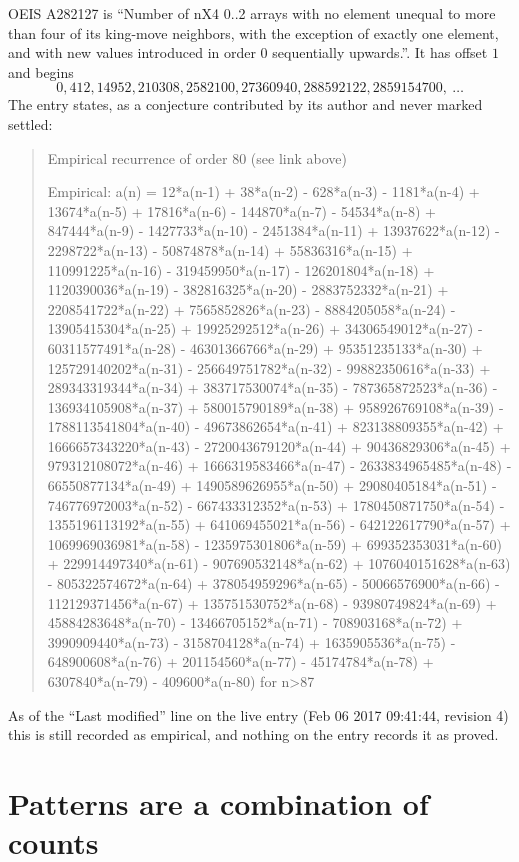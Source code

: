 \documentclass[11pt,a4paper]{article}
\theoremstyle{plain}
\theoremstyle{definition}
\begin{document}
OEIS A282127 is ``Number of nX4 0..2 arrays with no element unequal to more than four of its king-move neighbors, with the exception of exactly one element, and with new values introduced in order 0 sequentially upwards.''. It has offset $1$ and begins
\[
0, 412, 14952, 210308, 2582100, 27360940, 288592122, 2859154700,\ \dots
\]
The entry states, as a conjecture contributed by its author and never marked settled:
\begin{quote}
Empirical recurrence of order 80 (see link above)

Empirical: a(n) = 12*a(n-1) + 38*a(n-2) - 628*a(n-3) - 1181*a(n-4) + 13674*a(n-5) + 17816*a(n-6) - 144870*a(n-7) - 54534*a(n-8) + 847444*a(n-9) - 1427733*a(n-10) - 2451384*a(n-11) + 13937622*a(n-12) - 2298722*a(n-13) - 50874878*a(n-14) + 55836316*a(n-15) + 110991225*a(n-16) - 319459950*a(n-17) - 126201804*a(n-18) + 1120390036*a(n-19) - 382816325*a(n-20) - 2883752332*a(n-21) + 2208541722*a(n-22) + 7565852826*a(n-23) - 8884205058*a(n-24) - 13905415304*a(n-25) + 19925292512*a(n-26) + 34306549012*a(n-27) - 60311577491*a(n-28) - 46301366766*a(n-29) + 95351235133*a(n-30) + 125729140202*a(n-31) - 256649751782*a(n-32) - 99882350616*a(n-33) + 289343319344*a(n-34) + 383717530074*a(n-35) - 787365872523*a(n-36) - 136934105908*a(n-37) + 580015790189*a(n-38) + 958926769108*a(n-39) - 1788113541804*a(n-40) - 49673862654*a(n-41) + 823138809355*a(n-42) + 1666657343220*a(n-43) - 2720043679120*a(n-44) + 90436829306*a(n-45) + 979312108072*a(n-46) + 1666319583466*a(n-47) - 2633834965485*a(n-48) - 66550877134*a(n-49) + 1490589626955*a(n-50) + 29080405184*a(n-51) - 746776972003*a(n-52) - 667433312352*a(n-53) + 1780450871750*a(n-54) - 1355196113192*a(n-55) + 641069455021*a(n-56) - 642122617790*a(n-57) + 1069969036981*a(n-58) - 1235975301806*a(n-59) + 699352353031*a(n-60) + 229914497340*a(n-61) - 907690532148*a(n-62) + 1076040151628*a(n-63) - 805322574672*a(n-64) + 378054959296*a(n-65) - 50066576900*a(n-66) - 112129371456*a(n-67) + 135751530752*a(n-68) - 93980749824*a(n-69) + 45884283648*a(n-70) - 13466705152*a(n-71) - 708903168*a(n-72) + 3990909440*a(n-73) - 3158704128*a(n-74) + 1635905536*a(n-75) - 648900608*a(n-76) + 201154560*a(n-77) - 45174784*a(n-78) + 6307840*a(n-79) - 409600*a(n-80) for n>87
\end{quote}
As of the ``Last modified'' line on the live entry (Feb 06 2017 09:41:44, revision 4) this is still
recorded as empirical, and nothing on the entry records it as proved.

\section{Patterns are a combination of counts}
\end{document}
